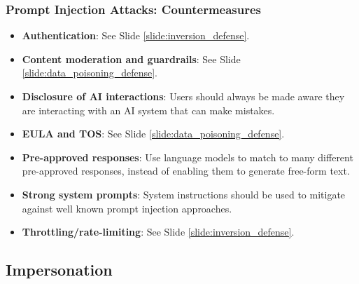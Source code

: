 \documentclass[11pt,
               aspectratio=169,
               hyperref={colorlinks}
               ]{beamer}
\begin{document}
			\begin{frame}
	
				\frametitle{Prompt Injection Attacks: \textbf{Countermeasures}}	
				\begin{itemize}
					\item \textbf{Authentication}: See Slide \ref{slide:inversion_defense}. 
					\item \textbf{Content moderation and guardrails}: See Slide 
					\ref{slide:data_poisoning_defense}.
					\item \textbf{Disclosure of AI interactions}: Users should always be made aware they are interacting with an AI system that can make mistakes. 
					\item \textbf{EULA and TOS}: See Slide \ref{slide:data_poisoning_defense}.
					\item \textbf{Pre-approved responses}: Use language models to match to many different pre-approved responses, instead of enabling them to generate free-form text. 
					\item \textbf{Strong system prompts}: System instructions should be used to mitigate against well known prompt injection approaches. 
					\item \textbf{Throttling/rate-limiting}: See Slide \ref{slide:inversion_defense}. 				
				\end{itemize}
			\end{frame}		

		\subsection{Impersonation}
\end{document}

